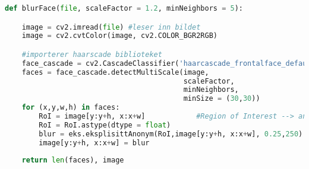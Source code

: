 \begin{lstlisting}[language=Python]
def blurFace(file, scaleFactor = 1.2, minNeighbors = 5):

    image = cv2.imread(file) #leser inn bildet
    image = cv2.cvtColor(image, cv2.COLOR_BGR2RGB)

    #importerer haarscade biblioteket
    face_cascade = cv2.CascadeClassifier('haarcascade_frontalface_default.xml')  
    faces = face_cascade.detectMultiScale(image,
                                          scaleFactor,
                                          minNeighbors,
                                          minSize = (30,30))
    for (x,y,w,h) in faces:
        RoI = image[y:y+h, x:x+w]            #Region of Interest --> ansiktet
        RoI = RoI.astype(dtype = float)
        blur = eks.eksplisittAnonym(RoI,image[y:y+h, x:x+w], 0.25,250)               
        image[y:y+h, x:x+w] = blur
        
    return len(faces), image
    \end{lstlisting}


    